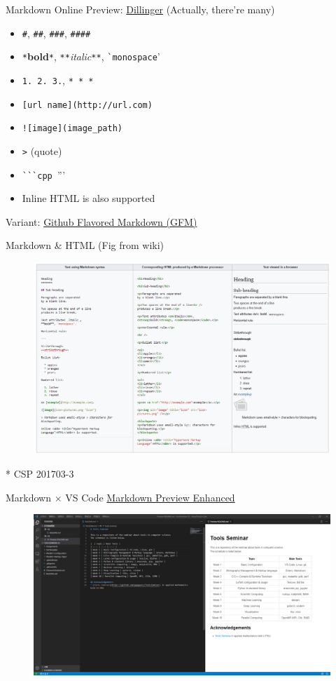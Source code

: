 \documentclass{../TexTemplate/myslide}
\begin{document}
\begin{frame}[fragile]{Markdown}
Online Preview: \href{https://dillinger.io/}{Dillinger} (Actually, there're many)
\begin{itemize}
	\item \verb'#', \verb'##', \verb'###', \verb'####'
	\item \verb'*'\textbf{bold}\verb'*', \verb'**'\emph{italic}\verb'**', \verb'`monospace''
	\item \verb'1. 2. 3.', \verb'* * *'
	\item \verb'[url name](http://url.com)'
	\item \verb'![image](image_path)'
	\item \verb'>' (quote)
	\item \verb'```cpp ''''
	\item Inline HTML is also supported
\end{itemize}
Variant: \href{https://github.github.com/gfm/}{Github Flavored Markdown (GFM)}
\end{frame}

\begin{frame}{Markdown \& HTML (Fig from wiki)}
\begin{figure}
\centering
\includegraphics[width=0.8\linewidth]{fig/markdown-http.png}
\end{figure}
* CSP 201703-3
\end{frame}

\begin{frame}{Markdown $\times$ VS Code}
\href{https://github.com/shd101wyy/vscode-markdown-preview-enhanced}{Markdown Preview Enhanced}
\begin{figure}
\centering
\includegraphics[width=\linewidth]{fig/markdown-preview.png}
\end{figure}
\end{frame}
\end{document}
